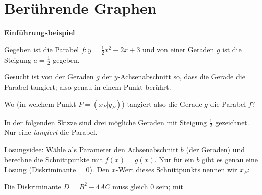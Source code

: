 \section{Berührende Graphen}

\textbf{Einführungsbeispiel}


Gegeben ist die Parabel $f: y=\frac{1}{2}x^2 -2x +3$ und von einer
Geraden $g$ ist die Steigung $a =\frac12$ gegeben.

Gesucht ist von der Geraden $g$ der $y$-Achsenabschnitt so, dass die
Gerade die Parabel tangiert; also genau in einem Punkt berührt.

Wo (in welchem Punkt $P=(x_P|y_P)$) tangiert also die Gerade $g$ die Parabel $f$?

In der folgenden Skizze sind drei mögliche Geraden mit Steigung
$\frac{1}{2}$ gezeichnet. Nur eine \textit{tangiert} die Parabel.


Lösungsidee: Wähle als Parameter den Achsenabschnitt $b$ (der Geraden)
und berechne die Schnittpunkte mit $f(x) = g(x)$. Nur für ein $b$ gibt
es genau eine Lösung (Diskriminante = 0). Den $x$-Wert dieses
Schnittpunkts nennen wir $x_P$:


\newpage

Die Diskriminante $D=B^2 - 4AC$ muss gleich 0 sein; mit

  
